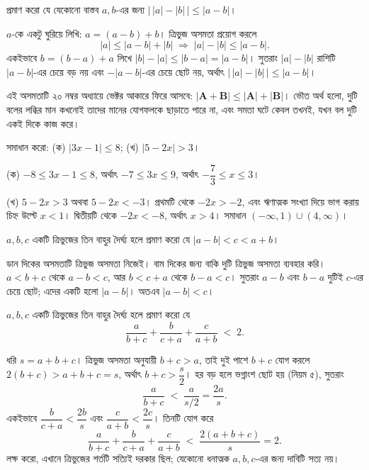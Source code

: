 \documentclass[11pt]{article}
\begin{document}
\begin{example}
প্রমাণ করো যে যেকোনো বাস্তব $a, b$-এর জন্য
$\bigl| \, |a| - |b| \, \bigr| \leq |a - b|$।
\end{example}

\begin{solbox}
$a$-কে একটু ঘুরিয়ে লিখি: $a = (a - b) + b$। ত্রিভুজ অসমতা প্রয়োগ করলে
\[
  |a| \leq |a-b| + |b| \;\Longrightarrow\; |a| - |b| \leq |a-b| .
\]
একইভাবে $b = (b-a) + a$ লিখে $|b| - |a| \leq |b-a| = |a-b|$। সুতরাং
$|a| - |b|$ রাশিটি $|a-b|$-এর চেয়ে বড় নয় এবং $-|a-b|$-এর চেয়ে ছোট নয়, অর্থাৎ
$\bigl| \, |a| - |b| \, \bigr| \leq |a-b|$।
\end{solbox}

\begin{remark}
এই অসমতাটি ২০ নম্বর অধ্যায়ে ভেক্টর আকারে ফিরে আসবে:
$|\mathbf{A} + \mathbf{B}| \leq |\mathbf{A}| + |\mathbf{B}|$। ভৌত অর্থ হলো, দুটি
বলের লব্ধির মান কখনোই তাদের মানের যোগফলকে ছাড়াতে পারে না, এবং সমতা ঘটে কেবল
তখনই, যখন বল দুটি একই দিকে কাজ করে।
\end{remark}

 সমাধান করো: (ক) $|3x - 1| \leq 8$; (খ) $|5 - 2x| > 3$।

\begin{sol}
(ক) $-8 \leq 3x - 1 \leq 8$, অর্থাৎ $-7 \leq 3x \leq 9$, অর্থাৎ
$-\dfrac{7}{3} \leq x \leq 3$।

(খ) $5 - 2x > 3$ অথবা $5 - 2x < -3$। প্রথমটি থেকে $-2x > -2$, এবং ঋণাত্মক সংখ্যা
দিয়ে ভাগ করায় চিহ্ন উল্টে $x < 1$। দ্বিতীয়টি থেকে $-2x < -8$, অর্থাৎ $x > 4$।
সমাধান $(-\infty, 1) \cup (4, \infty)$।
\end{sol}

 $a, b, c$ একটি ত্রিভুজের তিন বাহুর দৈর্ঘ্য হলে প্রমাণ করো যে
$|a - b| < c < a + b$।

\begin{sol}
ডান দিকের অসমতাটি ত্রিভুজ অসমতা নিজেই। বাম দিকের জন্য বাকি দুটি ত্রিভুজ অসমতা
ব্যবহার করি। $a < b + c$ থেকে $a - b < c$, আর $b < c + a$ থেকে $b - a < c$।
সুতরাং $a - b$ এবং $b - a$ দুটিই $c$-এর চেয়ে ছোট; এদের একটি হলো $|a-b|$।
অতএব $|a - b| < c$।
\end{sol}

 $a, b, c$ একটি ত্রিভুজের তিন বাহুর দৈর্ঘ্য হলে প্রমাণ করো যে
\[
  \frac{a}{b+c} + \frac{b}{c+a} + \frac{c}{a+b} \;<\; 2 .
\]

\begin{sol}
ধরি $s = a + b + c$। ত্রিভুজ অসমতা অনুযায়ী $b + c > a$, তাই দুই পাশে $b+c$ যোগ
করলে $2(b+c) > a + b + c = s$, অর্থাৎ $b + c > \dfrac{s}{2}$। হর বড় হলে ভগ্নাংশ
ছোট হয় (নিয়ম ৫), সুতরাং
\[
  \frac{a}{b+c} \;<\; \frac{a}{s/2} = \frac{2a}{s} .
\]
একইভাবে $\dfrac{b}{c+a} < \dfrac{2b}{s}$ এবং $\dfrac{c}{a+b} < \dfrac{2c}{s}$।
তিনটি যোগ করে
\[
  \frac{a}{b+c} + \frac{b}{c+a} + \frac{c}{a+b}
  \;<\; \frac{2(a+b+c)}{s} = 2 .
\]
লক্ষ করো, এখানে ত্রিভুজের শর্তটি সত্যিই দরকার ছিল; যেকোনো ধনাত্মক $a,b,c$-এর
জন্য দাবিটি সত্য নয়।
\end{sol}
\end{document}
